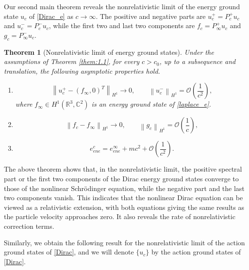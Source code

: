 \documentclass{amsart}
\theoremstyle{plain}
\newtheorem{theorem}{Theorem}[section]
\theoremstyle{definition}
\theoremstyle{remark}
\numberwithin{equation}{section} \numberwithin{figure}{section}
\begin{document}
Our second main theorem reveals the nonrelativistic limit of the energy ground state \(u_c\) of \eqref{Dirac_e} as \(c \to \infty\). The positive and negative parts are \(u_c^+ = P_c^+ u_c\) and \(u_c^- = P_c^- u_c\), while the first two and last two components are \(f_c = P_\infty^+ u_c\) and \(g_c = P_\infty^- u_c\).


\begin{theorem}[Nonrelativistic limit of  energy ground states]\label{them:1.2}
  \normalfont
  Under the assumptions of Theorem \ref{them:1.1}, for every \(c > c_0\), up to a subsequence and 
   translation, the following asymptotic properties hold. 
   \begin{enumerate}
    \item     
\[\left\|u_c^+ - (f_\infty, 0)^T\right\|_{H^1} \to 0, \qquad \left\|u_c^-\right\|_{H^1} = \mathcal{O}\left(\frac{1}{c^2}\right),\] 
where \(f_\infty\in H^1(\mathbb{R}^3, \mathbb{C}^2)\) is an energy ground state of \eqref{laplace_e}.
  \item \[
  \left\|f_c - f_\infty\right\|_{H^1} \to 0, \qquad \left\|g_c\right\|_{H^1} = \mathcal{O}\left(\frac{1}{c}\right),
  \] 
  \item  $$e_{ene}^c= e^\infty_{ene}+mc^2+ \mathcal{O}\left(\frac{1}{c^2}\right).$$
  \end{enumerate}
 \end{theorem}

The above theorem shows that, in the nonrelativistic limit, the positive spectral part or the first two components of the Dirac energy ground states converge to those of the nonlinear Schr\"odinger equation, while the negative part and the last two components vanish. This indicates that the nonlinear Dirac equation can be viewed as a relativistic extension, with both equations giving the same results as the particle velocity approaches zero. It also reveals the rate of nonrelativistic correction terms. 

Similarly, we obtain the following result for the nonrelativistic limit of the action ground states of \eqref{Dirac}, and we will denote \(\{u_c\}\)  by the action ground states of \eqref{Dirac}.
\end{document}
